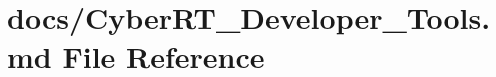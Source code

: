 \hypertarget{CyberRT__Developer__Tools_8md}{\section{docs/\-Cyber\-R\-T\-\_\-\-Developer\-\_\-\-Tools.md File Reference}
\label{CyberRT__Developer__Tools_8md}
}
